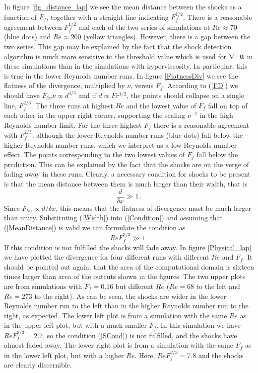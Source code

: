 \documentclass{jfm}
\begin{document}
In figure \ref{fig_distance_lap} we see the mean distance between the shocks as a function of $ F_f $, together with a straight line indicating $ F_f^{1/2} $. There is a reasonable agreement between $ F_f ^{1/2} $ and each of the two series of simulations at $ Re \approx 70 $ (blue dots) and $ Re \approx 200$ (yellow triangles). However, there is a gap between the two series. This gap may be explained by the fact that the shock detection algorithm is much more sensitive to the threshold value which is used for $ \nabla \cdot {\bf u} $ in these simulations than in the simulations with hyperviscosity.  In particular, this is true in the lower Reynolds number runs. In figure \ref{FlatnessDiv} we see the flatness of the divergence, multiplied by $ \nu $, versus $ F_f $. According to (\ref{FD}) we should have $ F_{\partial u} \nu \propto  d^{4/3} $ and if $ d \propto Fr^{1/2} $, the points should collapse on a single line, $ F_f^{2/3} $.  The three runs at highest $ Re $ and the lowest value of $ F_f $ fall on top of each other in the upper right corner, supporting the scaling $ \nu^{-1} $ in the high Reynolds number limit. For the three highest $ F_f $ there is a reasonable agreement with $ F_f^{2/3} $, although the lower Reynolds number runs (blue dots) fall below the higher Reynolds number runs, which we interpret as a low Reynolds number effect. The points corresponding to the two lowest values of $ F_f $ fall below the prediction. This can be explained by the fact that the shocks are on the verge of fading away in these runs. Clearly, a necessary condition for shocks to be present is that the mean distance between them is much larger than their  width, that is
\begin{equation} \label{Condition} 
\frac{d}{\delta x} \gg  1\, .
\end{equation} 
Since $ F_{\partial u} \propto d/\delta x $, this means that the flatness of divergence must be much larger than unity. Substituting (\ref{Width}) into (\ref{Condition})  and assuming that (\ref{MeanDistance}) is valid we can formulate the condition as
\begin{equation}  \label{SCond}
Re F_f^{2/3} \gg 1 \, .
\end{equation} 
If this condition is not fulfilled the shocks will fade away.  In figure \ref{Physical_lap} we have plotted the divergence for four different runs with different $ Re $ and $ F_f $. It should be pointed out again, that the area of the computational domain is sixteen times larger than area of the outcuts shown in the figures.  The two upper plots are from simulations with  $ F_f = 0.16 $ but different $ Re $ ($ Re = 68 $ to the left and $ Re = 273 $ to the right). As can be seen, the shocks are wider in the lower Reynolds number run to the left than in the higher Reynolds number run to the right, as expected. The lower left plot is from a simulation with the same $ Re $ as in the upper left plot, but with a much smaller $ F_f $. In this simulation we have $ Re F_f^{2/3} = 2.7 $, so the condition (\ref{SCond}) is not fulfilled, and the shocks have almost faded away. The lower right plot is from a simulation with the same $ F_f $ as in the lower left plot, but with a higher $ Re $. Here, $ Re F_f^{2/3} = 7.8 $ and  the shocks are clearly discernible.





\end{document}
